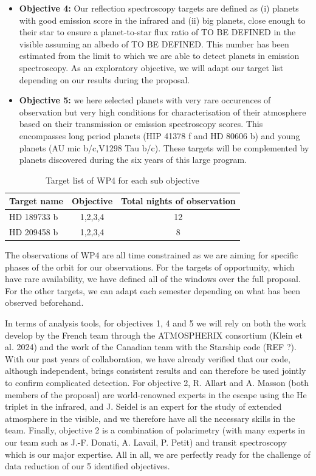 \documentclass[
    traditabstract,
    longauth,
    onecolumn,
]{aa}
\begin{document}
\begin{itemize}
    \item {\bf Objective 4:} Our reflection spectroscopy targets are defined as (i) planets with good emission score in the infrared and (ii) big planets, close enough to their star to ensure a planet-to-star flux ratio of TO BE DEFINED in the visible assuming an albedo of TO BE DEFINED. This number has been estimated from the limit to which we are able to detect planets in emission spectroscopy. As an exploratory objective, we will adapt our target list depending on our results during the proposal.

    \item {\bf Objective 5:} we here selected planets with very rare occurences of observation but very high conditions for characterisation of their atmosphere based on their transmission or emission spectroscopy scores. This encompasses long period planets (HIP 41378 f and HD 80606 b) and young planets (AU mic b/c,V1298 Tau b/c). These targets will be complemented by planets discovered during the six years of this large program. 

\end{itemize}

\begin{table}[h!]
    \centering
    \begin{tabular}{lcc}
           Target name & Objective & Total nights of observation\\\hline
        HD 189733 b& 1,2,3,4 & 12\\
        HD 209458 b& 1,2,3,4 & 8 \\
        \hline
    \end{tabular}
    \caption{Target list of WP4 for each sub objective}
    \label{tab:WP4}
\end{table}


The observations of WP4 are all time constrained as we are aiming for specific phases of the orbit for our observations. For the targets of opportunity, which have rare availability, we have defined all of the windows over the full proposal. For the other targets, we can adapt each semester depending on what has been observed beforehand. 

In terms of analysis tools, for objectives 1, 4 and 5 we will rely on both the work develop by the French team through the ATMOSPHERIX consortium (Klein et al. 2024) and the work of the Canadian team with the Starship code (REF ?). With our past years of collaboration, we have already verified that our code, although independent, brings consistent results and can therefore be used jointly to confirm complicated detection. For objective 2, R. Allart and A. Masson (both members of the proposal) are world-renowned experts in the escape using the He triplet in the infrared, and J. Seidel is an expert for the study of extended atmosphere in the visible, and we therefore have all the necessary skills in the team. Finally, objective 2 is a combination of polarimetry (with many experts in our team such as J.-F. Donati, A. Lavail, P. Petit) and transit spectroscopy which is our major expertise. All in all, we are perfectly ready for the challenge of data reduction of our 5 identified objectives.
\end{document}
